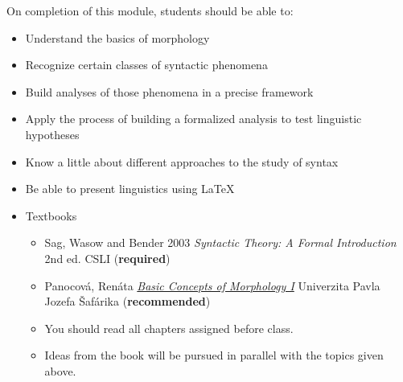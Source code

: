\documentclass[a4paper,landscape,headrule,footrule]{foils}
\begin{document}


On completion of this module, students should be able to:
\begin{itemize}
\item Understand the basics of morphology
\item Recognize certain classes of syntactic phenomena
\item Build analyses of those phenomena in a precise framework
\item Apply the process of building a formalized analysis to test
  linguistic hypotheses
\item Know a little about different approaches to the study of syntax
\item Be able to present linguistics using LaTeX
\end{itemize}
    
%



\begin{itemize}
\item Textbooks
  \begin{itemize}
  \item Sag, Wasow and Bender 2003 \textit{Syntactic Theory: A Formal Introduction} 2nd ed. CSLI (\textbf{required})
 \item Panocová, Renáta \href{https://unibook.upjs.sk/img/cms/2021/FF/basic-concepts-of-morphology-1.pdf}{\textit{Basic Concepts of Morphology I}} Univerzita Pavla Jozefa Šafárika  (\textbf{recommended})
  \end{itemize}

  
  \begin{itemize}
  \item You should read all chapters assigned before class.
  \item Ideas from the book will be pursued in parallel with the
    topics given above.
  \end{itemize}
\end{itemize}
\end{document}

